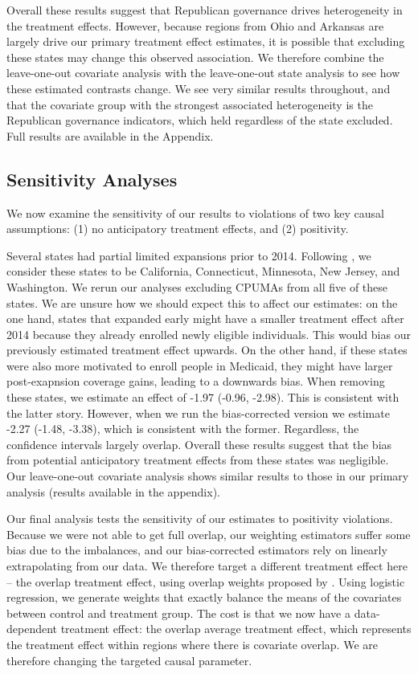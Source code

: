 \documentclass[12pt]{article}
\begin{document}
Overall these results suggest that Republican governance drives heterogeneity in the treatment effects. However, because regions from Ohio and Arkansas are largely drive our primary treatment effect estimates, it is possible that excluding these states may change this observed association. We therefore combine the leave-one-out covariate analysis with the leave-one-out state analysis to see how these estimated contrasts change. We see very similar results throughout, and that the covariate group with the strongest associated heterogeneity is the Republican governance indicators, which held regardless of the state excluded. Full results are available in the Appendix.

\subsection{Sensitivity Analyses}

We now examine the sensitivity of our results to violations of two key causal assumptions: (1) no anticipatory treatment effects, and (2) positivity.

Several states had partial limited expansions prior to 2014. Following \cite{frean2017premium}, we consider these states to be California, Connecticut, Minnesota, New Jersey, and Washington. We rerun our analyses excluding CPUMAs from all five of these states. We are unsure how we should expect this to affect our estimates: on the one hand, states that expanded early might have a smaller treatment effect after 2014 because they already enrolled newly eligible individuals. This would bias our previously estimated treatment effect upwards. On the other hand, if these states were also more motivated to enroll people in Medicaid, they might have larger post-exapnsion coverage gains, leading to a downwards bias. When removing these states, we estimate an effect of -1.97 (-0.96, -2.98). This is consistent with the latter story. However, when we run the bias-corrected version we estimate -2.27 (-1.48, -3.38), which is consistent with the former. Regardless, the confidence intervals largely overlap. Overall these results suggest that the bias from potential anticipatory treatment effects from these states was negligible. Our leave-one-out covariate analysis shows similar results to those in our primary analysis (results available in the appendix).

Our final analysis tests the sensitivity of our estimates to positivity violations. Because we were not able to get full overlap, our weighting estimators suffer some bias due to the imbalances, and our bias-corrected estimators rely on linearly extrapolating from our data. We therefore target a different treatment effect here -- the overlap treatment effect, using overlap weights proposed by \cite{li2018balancing}. Using logistic regression, we generate weights that exactly balance the means of the covariates between control and treatment group. The cost is that we now have a data-dependent treatment effect: the overlap average treatment effect, which represents the treatment effect within regions where there is covariate overlap. We are therefore changing the targeted causal parameter.
\end{document}
